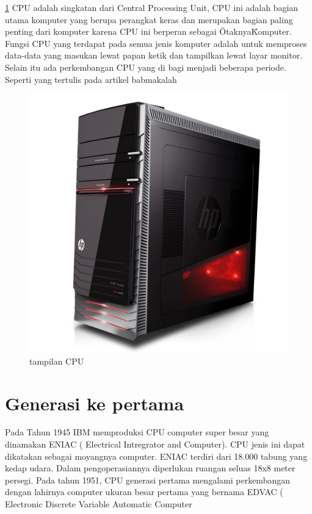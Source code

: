	


	\ref{CPU}
CPU adalah singkatan dari Central Processing Unit, CPU ini adalah bagian utama komputer yang berupa perangkat keras dan merupakan bagian paling penting dari komputer karena CPU ini berperan sebagai \"Otaknya\" Komputer. Fungsi CPU yang terdapat pada semua jenis komputer adalah untuk memproses data-data yang masukan lewat papan ketik dan tampilkan lewat layar monitor. Selain itu ada perkembangan CPU yang di bagi menjadi beberapa periode. Seperti yang tertulis pada artikel babmakalah \cite{babmakalah}


\begin{figure}[ht]
\centerline{\includegraphics[width=1\textwidth]{figures/CPU.jpg}}
\caption{tampilan CPU}
\label{CPU}
\end{figure}

	\section{Generasi ke pertama}
Pada Tahun 1945 IBM memproduksi CPU computer super besar yang dinamakan ENIAC ( Electrical Intregrator and Computer). CPU jenis ini dapat dikatakan sebagai moyangnya computer. ENIAC  terdiri dari 18.000 tabung yang kedap udara. Dalam pengoperasiannya diperlukan ruangan seluas 18x8 meter persegi.
Pada tahun 1951, CPU generasi pertama mengalami perkembangan dengan lahirnya computer ukuran besar pertama yang bernama EDVAC ( Electronic Discrete Variable Automatic Computer

